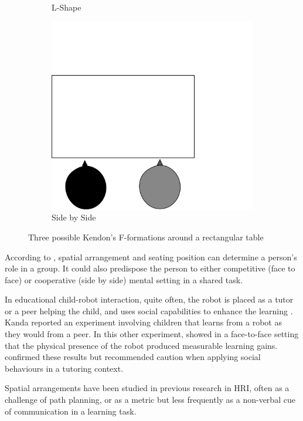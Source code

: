 \documentclass[letterpaper, 10 pt, conference]{ieeeconf}  %
\begin{document}
\begin{figure}[h!]
\begin{subfigure}{0.2\textwidth}
		\caption{L-Shape}
		\label{fig:lshape}
	\end{subfigure}
	\begin{subfigure}{0.2\textwidth}
		\centering
		\includegraphics[width=0.75\linewidth]{./figures/fformationss.png}
		\caption{Side by Side }
		\label{fig:sidebside}
	\end{subfigure}
	\caption{Three possible Kendon's F-formations around a rectangular table}
	\label{fig:fformations}
\end{figure}

According to \cite{knapp2013nonverbal}, spatial arrangement and seating position can determine a person's role in a group.
It could also predispose the person to either competitive (face to face) or cooperative (side by side) mental setting in a shared task.



In educational child-robot interaction, quite often, the robot is placed as a tutor or a peer helping the child, and uses social capabilities to enhance the learning \cite{Saerbeck2010}.
Kanda \cite{Kanda2004} reported an experiment involving children that learns from a robot as they would from a peer.
In this other experiment,
\cite{Leyzberg2014} showed in a face-to-face setting that the physical presence of the robot produced measurable learning gains.
\cite{Kennedy2015} confirmed these results but recommended caution when applying social behaviours in a tutoring context. 

Spatial arrangements have been studied in previous research\cite{Kuzuoka,huttenrauch2006investigating,vazquez2014spatial} in HRI, often as a challenge of path planning, or as a metric but less frequently as a non-verbal cue of communication in a learning task.
\end{document}
